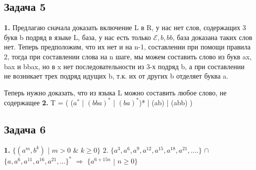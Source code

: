 \documentclass[a4paper,14pt]{article} %
\begin{document}
\subsection{Задача 5}
\textbf{1.} Предлагаю сначала доказать включение L в R, у нас нет слов, содержащих 3 букв b подряд в языке L, база, у нас есть только $\mathcal{E}, b, bb$, база доказана таких слов нет.
Теперь предположим, что их нет и на n-1, составлении при помощи правила 2, тогда при составлении слова на n шаге, мы можем составить слово из букв ax, bax и bbax, но в x нет последовательности 
из 3-х подряд b, а при составлении не возникает трех подряд идущих b, т.к. их от других b отделяет буква a. 

Теперь нужно доказать, что из языка L можно составить любое слово, не содержащее
\newline
\textbf{2.} T = ( ($a^{*}$ | $(bba)^{*}$ | $(ba)^{*}$)* | (ab) | (abb) )
\subsection{Задача 6}
\textbf{1.} $\{(a^{m}, b^{k})$ | $m > 0$ \& $k \geq 0 \}$
\newline
$2.$ $\{a^3, a^6, a^9, a^{12}, a^{15}, a^{18}, a^{21}, .... \}$ $\cap$  
$\{a, a^6, a^{11}, a^{16}, a^{21}, ... \}^{*}$ 
$\Longrightarrow$ $\{ a^{6+15n}$ | $n \geq 0 \}$
\end{document}

